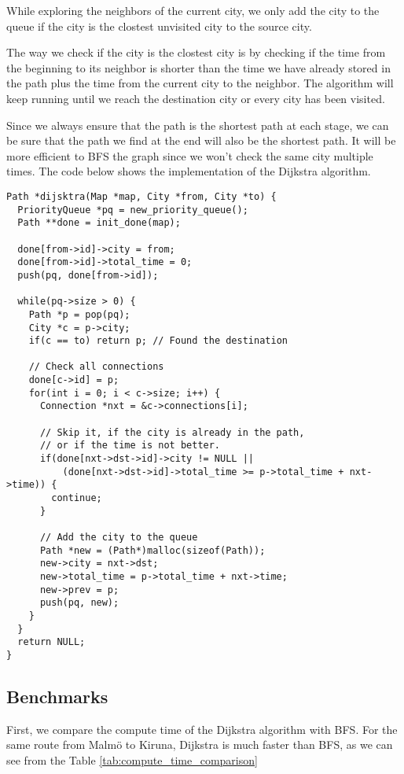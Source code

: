 \documentclass[a4paper,11pt]{article}
\begin{document}
While exploring the neighbors of the current city,
we only add the city to the queue if the city is the clostest unvisited city to the source city.

The way we check if the city is the clostest city is by checking if 
the time from the beginning to its neighbor is shorter than the time
we have already stored in the path plus the time from the current city to the neighbor.
The algorithm will keep running until we reach the destination city or every city has been visited.

Since we always ensure that the path is the shortest path at each stage, we can be sure that the path we find 
at the end will also be the shortest path. 
It will be more efficient to BFS the graph since we won't check the same city multiple times.
The code below shows the implementation of the Dijkstra algorithm.

\begin{verbatim}
Path *dijsktra(Map *map, City *from, City *to) {
  PriorityQueue *pq = new_priority_queue();
  Path **done = init_done(map);

  done[from->id]->city = from;
  done[from->id]->total_time = 0;
  push(pq, done[from->id]);

  while(pq->size > 0) {
    Path *p = pop(pq);
    City *c = p->city;
    if(c == to) return p; // Found the destination

    // Check all connections
    done[c->id] = p;
    for(int i = 0; i < c->size; i++) {
      Connection *nxt = &c->connections[i];

      // Skip it, if the city is already in the path,
      // or if the time is not better.        
      if(done[nxt->dst->id]->city != NULL || 
          (done[nxt->dst->id]->total_time >= p->total_time + nxt->time)) {
        continue;
      }

      // Add the city to the queue
      Path *new = (Path*)malloc(sizeof(Path));
      new->city = nxt->dst;
      new->total_time = p->total_time + nxt->time;
      new->prev = p;
      push(pq, new);
    }
  }
  return NULL;
}
\end{verbatim}

\subsection*{Benchmarks}

First, we compare the compute time of the Dijkstra algorithm with BFS.
For the same route from Malmö to Kiruna,
Dijkstra is much faster than BFS, as we can see from the Table \ref{tab:compute_time_comparison}
\end{document}
